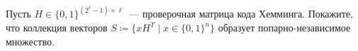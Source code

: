 Пусть $H \in \{0, 1\}^{(2^{\ell} - 1) \times \ell}$~--- проверочная матрица кода Хемминга. Покажите, что
коллекция векторов $S \coloneqq \{x H^T \mid x \in \{0, 1\}^n\}$ образует попарно-независимое множество.
